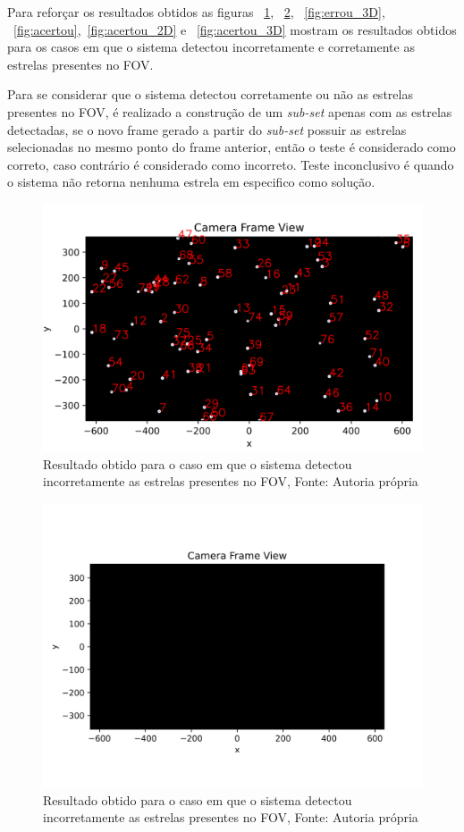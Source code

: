 Para reforçar os resultados obtidos as figuras ~\ref{fig:errou}, ~\ref{fig:errou_2D}, ~\ref{fig:errou_3D}, ~\ref{fig:acertou},~\ref{fig:acertou_2D} e ~\ref{fig:acertou_3D} mostram os resultados obtidos para os casos em que o sistema detectou incorretamente e corretamente as estrelas presentes no FOV.

Para se considerar que o sistema detectou corretamente ou não as estrelas presentes no FOV, 
é realizado a construção de um \textit{sub-set} apenas com as estrelas detectadas, 
se o novo frame gerado a partir do \textit{sub-set} possuir as estrelas selecionadas no mesmo ponto do frame anterior, 
então o teste é considerado como correto, caso contrário é considerado como incorreto.
Teste inconclusivo é quando o sistema não retorna nenhuma estrela em especifico como solução. 

\begin{figure}[H]
    \centering
    \includegraphics[width=1\textwidth]{images/errou.png}
    \caption{Resultado obtido para o caso em que o sistema detectou incorretamente as estrelas presentes no FOV, Fonte: Autoria própria}
    \label{fig:errou}
\end{figure}

\begin{figure}[H]
    \centering
    \includegraphics[width=1\textwidth]{images/errou_2D.png}
    \caption{Resultado obtido para o caso em que o sistema detectou incorretamente as estrelas presentes no FOV, Fonte: Autoria própria}
    \label{fig:errou_2D}
\end{figure}


